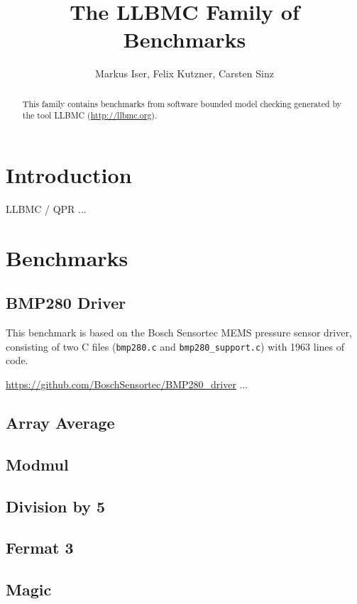 \documentclass[conference]{IEEEtran}
\title{The LLBMC Family of Benchmarks}
\author{Markus Iser, Felix Kutzner, Carsten Sinz}
\begin{document}


\maketitle

\begin{abstract}
This family contains benchmarks from software bounded model checking
generated by the tool LLBMC (\url{http://llbmc.org}).
\end{abstract}

\section{Introduction}

LLBMC / QPR ...

\section{Benchmarks}

\subsection{BMP280 Driver}

This benchmark is based on the Bosch Sensortec MEMS pressure sensor driver,
consisting of two C files (\texttt{bmp280.c} and \texttt{bmp280\_support.c}) with 1963 lines of code.

\url{https://github.com/BoschSensortec/BMP280_driver}
...

\subsection{Array Average}



\subsection{Modmul}



\subsection{Division by 5}



\subsection{Fermat 3}



\subsection{Magic}




%
%
%
\end{document}
